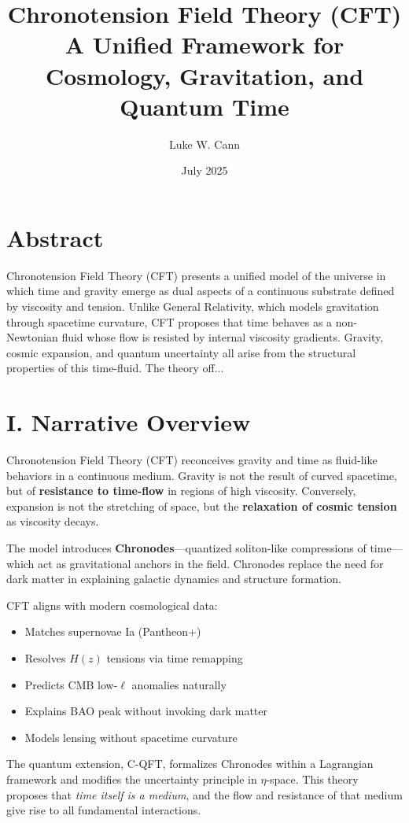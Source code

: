 \documentclass[12pt]{article}
\title{Chronotension Field Theory (CFT)\\A Unified Framework for Cosmology, Gravitation, and Quantum Time}
\author{Luke W. Cann}
\date{July 2025}
\begin{document}
\maketitle

\section*{Abstract}
Chronotension Field Theory (CFT) presents a unified model of the universe in which time and gravity emerge as dual aspects of a continuous substrate defined by viscosity and tension. Unlike General Relativity, which models gravitation through spacetime curvature, CFT proposes that time behaves as a non-Newtonian fluid whose flow is resisted by internal viscosity gradients. Gravity, cosmic expansion, and quantum uncertainty all arise from the structural properties of this time-fluid. The theory off...

\section*{I. Narrative Overview}
Chronotension Field Theory (CFT) reconceives gravity and time as fluid-like behaviors in a continuous medium. Gravity is not the result of curved spacetime, but of \textbf{resistance to time-flow} in regions of high viscosity. Conversely, expansion is not the stretching of space, but the \textbf{relaxation of cosmic tension} as viscosity decays.

The model introduces \textbf{Chronodes}—quantized soliton-like compressions of time—which act as gravitational anchors in the field. Chronodes replace the need for dark matter in explaining galactic dynamics and structure formation.

CFT aligns with modern cosmological data:
\begin{itemize}
\item Matches supernovae Ia (Pantheon+)
\item Resolves $H(z)$ tensions via time remapping
\item Predicts CMB low-$\ell$ anomalies naturally
\item Explains BAO peak without invoking dark matter
\item Models lensing without spacetime curvature
\end{itemize}

The quantum extension, C-QFT, formalizes Chronodes within a Lagrangian framework and modifies the uncertainty principle in $\eta$-space. This theory proposes that \textit{time itself is a medium}, and the flow and resistance of that medium give rise to all fundamental interactions.
\end{document}

